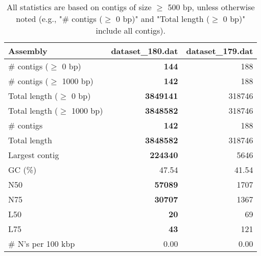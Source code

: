 \documentclass[12pt,a4paper]{article}
\begin{document}
\begin{table}[ht]
\begin{center}
\caption{All statistics are based on contigs of size $\geq$ 500 bp, unless otherwise noted (e.g., "\# contigs ($\geq$ 0 bp)" and "Total length ($\geq$ 0 bp)" include all contigs).}
\begin{tabular}{|l*{2}{|r}|}
\hline
Assembly & dataset\_180.dat & dataset\_179.dat \\ \hline
\# contigs ($\geq$ 0 bp) & {\bf 144} & 188 \\ \hline
\# contigs ($\geq$ 1000 bp) & {\bf 142} & 188 \\ \hline
Total length ($\geq$ 0 bp) & {\bf 3849141} & 318746 \\ \hline
Total length ($\geq$ 1000 bp) & {\bf 3848582} & 318746 \\ \hline
\# contigs & {\bf 142} & 188 \\ \hline
Total length & {\bf 3848582} & 318746 \\ \hline
Largest contig & {\bf 224340} & 5646 \\ \hline
GC (\%) & 47.54 & 41.54 \\ \hline
N50 & {\bf 57089} & 1707 \\ \hline
N75 & {\bf 30707} & 1367 \\ \hline
L50 & {\bf 20} & 69 \\ \hline
L75 & {\bf 43} & 121 \\ \hline
\# N's per 100 kbp & 0.00 & 0.00 \\ \hline
\end{tabular}
\end{center}
\end{table}
\end{document}
